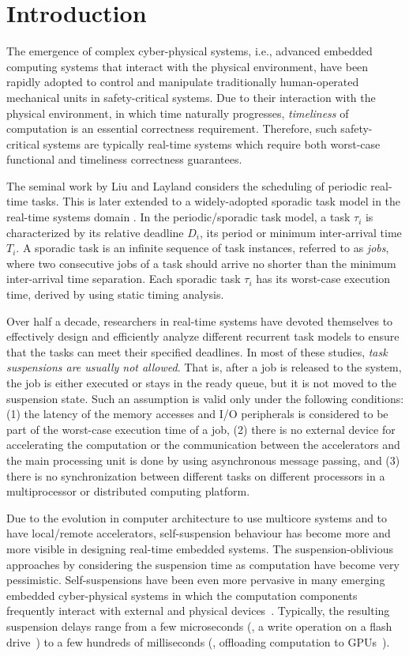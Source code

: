 \section{Introduction}

The emergence of complex cyber-physical systems, i.e., advanced embedded computing systems that interact with the physical environment, have been rapidly adopted to control and manipulate traditionally human-operated mechanical units in safety-critical systems.  Due to their interaction with the physical environment, in which time naturally progresses, \emph{timeliness} of computation is an essential correctness requirement.  Therefore, such safety-critical systems are typically real-time systems which require both worst-case functional and timeliness correctness guarantees.

The seminal work by Liu and Layland \cite{Liu_1973} considers the scheduling of periodic real-time tasks. This is later extended to a widely-adopted sporadic task model in the real-time systems domain \cite{Mok:1983:FDP:888951}. In the periodic/sporadic task model, a task $\tau_i$ is characterized by its relative deadline $D_i$, its period or minimum inter-arrival time $T_i$. A sporadic task is an infinite sequence of task instances, referred to as \emph{jobs}, where two consecutive jobs of a task should arrive no shorter than the minimum inter-arrival time separation. Each sporadic task $\tau_i$ has its worst-case execution time, derived by using static timing analysis.


Over half a decade, researchers in real-time systems have devoted themselves to effectively design and efficiently analyze different recurrent task models to ensure that the tasks can meet their specified deadlines. In most of these studies, \emph{task suspensions are usually not allowed}. That is, after a job is released to the system, the job is either executed or stays in the ready queue, but it is not moved to the suspension state. 
 Such an assumption is valid only under the following conditions: (1) the latency of the memory accesses and I/O peripherals is considered to be part of the worst-case execution time of a job, (2) there is no external device for accelerating the computation or the communication between the accelerators and the main processing unit is done by using asynchronous message passing, and (3) there is no synchronization between different tasks on different processors in a multiprocessor or distributed computing platform.

Due to the evolution in computer architecture to use multicore systems and to have local/remote accelerators, self-suspension behaviour has become more and more visible in designing real-time embedded systems.  The suspension-oblivious approaches by considering the suspension time as computation have become very pessimistic. Self-suspensions have been even more pervasive in many emerging embedded cyber-physical systems in which the computation components frequently interact with external and physical devices~\cite{Kang:rtss07,Kato_2011}.  Typically, the resulting suspension delays range from a few microseconds (\eg, a write operation on a flash drive~\cite{Kang:rtss07}) to a few hundreds of milliseconds (\eg, offloading computation to GPUs~\cite{Kato_2011,Liu_2014}).

